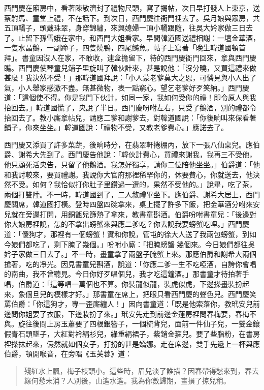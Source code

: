 西門慶在廂房中，看著陳敬濟封了禮物尺頭，寫了揭帖，次日早打發人上東京，送蔡駙馬、童堂上禮，不在話下。到次日，西門慶往衙門裡去了。吳月娘與眾房，共五頂轎子，頭戴珠翠，身穿錦繡，來興媳婦一頂小轎跟隨，往吳大妗家做三日去了。止留下孫雪娥在家中，和西門大姐看家。早間韓道國送禮相謝：一壇金華酒，一隻水晶鵝，一副蹄子，四隻燒鴨，四尾鰣魚。帖子上寫著「晚生韓道國頓首拜」。書童因沒人在家，不敢收，連盒擔留下，待的西門慶衙門回來，拿與西門慶瞧。西門慶使琴童兒鋪子里旋叫了韓伙計來，甚是說他：「沒分曉，又買這禮來做甚麼！我決然不受！」那韓道國拜說：「小人蒙老爹莫大之恩，可憐見與小人出了氣，小人舉家感激不盡。無甚微物，表一點窮心。望乞老爹好歹笑納。」西門慶道：「這個使不得。你是我門下伙計，如同一家，我如何受你的禮！即令原人與我抬回去。」韓道國慌了，央說了半日。西門慶吩咐左右，只受了鵝酒，別的禮都令抬回去了。教小廝拿帖兒，請應二爹和謝爹去，對韓道國說：「你後晌叫來保看著鋪子，你來坐坐。」韓道國說：「禮物不受，又教老爹費心。」應諾去了。

西門慶又添買了許多菜蔬，後晌時分，在翡翠軒捲棚內，放下一張八仙桌兒。應伯爵、謝希大先到了。西門慶告他說：「韓伙計費心，買禮來謝我，我再三不受他，他只顧死活央告，只留了他鵝酒。我怎好獨享，請你二位陪他坐坐。」伯爵道：「他和我討較來，要買禮謝。我說你大官府那裡稀罕你的，休要費心，你就送去，他決然不受。如何？我恰似打你肚子里鑽過一遭的，果然不受他的。」說畢，吃了茶，兩個打雙陸。不一時，韓道國到了，二人敘禮畢坐下。應伯爵、謝希大居上，西門慶關席，韓道國打橫。登時四盤四碗拿來，桌上擺了許多下飯，把金華酒分咐來安兒就在旁邊打開，用銅甑兒篩熱了拿來，教書童斟酒。伯爵吩咐書童兒：「後邊對你大娘房裡說，怎的不拿出螃蟹來與應二爹吃？你去說我要螃蟹吃哩。」西門慶道：「傻狗才，那裡有一個螃蟹！實和你說，管屯的徐大人送了我兩包螃蟹，到如今娘們都吃了，剩下腌了幾個。」吩咐小廝：「把腌螃蟹𢵞幾個來。今日娘們都往吳妗子家做三日去了。」不一時，畫童拿了兩盤子腌蟹上來。那應伯爵和謝希大兩個搶著，吃的凈光。因見書童兒斟酒，說道：「你應二爹一生不吃啞酒，自誇你會唱的南曲，我不曾聽見。今日你好歹唱個兒，我才吃這鐘酒。」那書童才待拍著手唱，伯爵道：「這等唱一萬個也不算。你裝龍似龍，裝虎似虎，下邊搽畫裝扮起來，象個旦兒的模樣才好。」那書童在席上，把眼只看西門慶的聲色兒。西門慶笑罵伯爵：「你這狗才，專一歪廝纏人！」因向書童道：「既是他索落你，教玳安兒前邊問你姐要了衣服，下邊妝扮了來。」玳安先走到前邊金蓮房裡問春梅要，春梅不與。旋往後問上房玉蕭要了四根銀簪子，一個梳背兒，面前一件仙子兒，一雙金鑲假青石頭墜子，大紅對衿絹衫兒，綠重絹裙子，紫銷金箍兒。要了些脂粉，在書房裡搽抹起來，儼然就如個女子，打扮的甚是嬌娜。走在席邊，雙手先遞上一杯與應伯爵，頓開喉音，在旁唱《玉芙蓉》道：
\begin{quote}
殘紅水上飄，梅子枝頭小。這些時，眉兒淡了誰描？因春帶得愁來到，春去緣何愁未消？人別後，山遙水遙。我為你數歸期，畫損了掠兒稍。
\end{quote}


